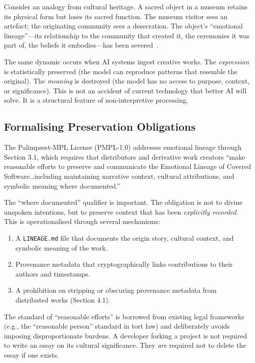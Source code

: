 \documentclass[11pt,twocolumn]{article}
\begin{document}
Consider an analogy from cultural heritage. A sacred object in a museum
retains its physical form but loses its sacred function. The museum
visitor sees an artefact; the originating community sees a desecration.
The object's ``emotional lineage''---its relationship to the community
that created it, the ceremonies it was part of, the beliefs it
embodies---has been severed~\cite{clifford1988predicament}.

The same dynamic occurs when AI systems ingest creative works. The
\emph{expression} is statistically preserved (the model can reproduce
patterns that resemble the original). The \emph{meaning} is destroyed
(the model has no access to purpose, context, or significance). This
is not an accident of current technology that better AI will solve. It
is a structural feature of non-interpretive processing.

\subsection{Formalising Preservation Obligations}

The Palimpsest-MPL License (PMPL-1.0) addresses emotional lineage
through Section 3.1, which requires that distributors and derivative
work creators ``make reasonable efforts to preserve and communicate the
Emotional Lineage of Covered Software\ldots including maintaining
narrative context, cultural attributions, and symbolic meaning where
documented.''

The ``where documented'' qualifier is important. The obligation is not
to divine unspoken intentions, but to preserve context that has been
\emph{explicitly recorded}. This is operationalised through several
mechanisms:

\begin{enumerate}[label=(\alph*)]
    \item A \texttt{LINEAGE.md} file that documents the origin story,
          cultural context, and symbolic meaning of the work.
    \item Provenance metadata that cryptographically links contributions
          to their authors and timestamps.
    \item A prohibition on stripping or obscuring provenance metadata
          from distributed works (Section 4.1).
\end{enumerate}

The standard of ``reasonable efforts'' is borrowed from existing legal
frameworks (e.g., the ``reasonable person'' standard in tort law) and
deliberately avoids imposing disproportionate burdens. A developer
forking a project is not required to write an essay on its cultural
significance. They \emph{are} required not to delete the essay if one
exists.
\end{document}
